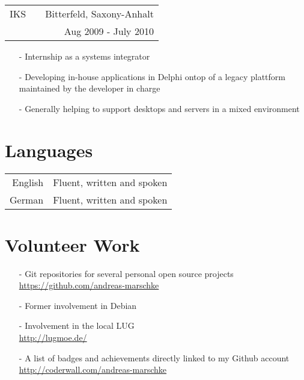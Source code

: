 \documentclass[11pt]{article}
\begin{document}
\pagebreak

\begin{tabular}{@{ } l @{} p{7.45cm} @{} r @{ }}
  IKS & & Bitterfeld, Saxony-Anhalt \\
  & & Aug 2009 - July 2010 \\
\end{tabular}

\begin{itemize}
  \item[-] Internship as a systems integrator
  \item[-] Developing in-house applications in Delphi ontop of a
    legacy plattform maintained by the developer in charge 
  \item[-] Generally helping to support desktops and servers in a
    mixed environment
\end{itemize}

\section*{Languages}

\begin{tabular}{@{} r @{ : } l @{}}
  English & Fluent, written and spoken \\
  German  & Fluent, written and spoken \\
\end{tabular}

\section*{Volunteer Work}
\begin{itemize}
  \item[-] Git repositories for several personal open source projects \\
    \url{https://github.com/andreas-marschke}
  \item[-] Former involvement in Debian
  \item[-] Involvement in the local LUG \\
    \url{http://lugmoe.de/}
  \item[-] A list of badges and achievements directly linked to my Github account \\
    \url{http://coderwall.com/andreas-marschke}

	
\end{itemize}
\end{document}
